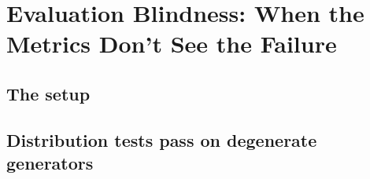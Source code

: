 \section{Evaluation Blindness: When the Metrics Don't See the Failure}
\label{sec:blindness}


\subsection{The setup}
\label{sec:blindness:setup}


\subsection{Distribution tests pass on degenerate generators}
\label{sec:blindness:dist}

\begin{table}[t]
  \centering
  \caption{Goodness-of-fit tests on return distributions. Higher is better
  (capped at 0.25 for AD, 1.0 for KS as in the original paper). }
  \label{tab:ks_ad}
\end{table}


